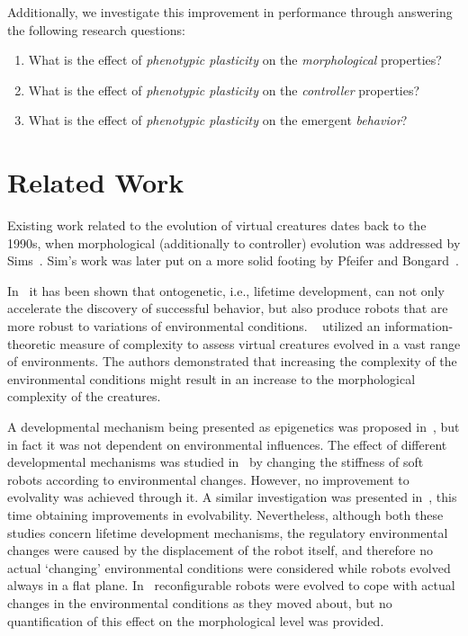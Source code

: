 \documentclass[utf8]{frontiersSCNS} %
\begin{document}
Additionally, we investigate this improvement in performance through answering the following research questions:
\begin{enumerate}

\item  What is the effect of \textit{phenotypic plasticity} on the \textit{morphological} properties?
\item  What is the effect of \textit{phenotypic plasticity} on the \textit{controller} properties?
\item  What is the effect of \textit{phenotypic plasticity} on the emergent \textit{behavior}?
\end{enumerate}


\section{Related Work}
Existing work related to the evolution of virtual creatures dates back to the 1990s, when morphological (additionally to controller) evolution was addressed by Sims~\citep{sims1994evolving}. Sim's work was later put on a more solid footing by Pfeifer and Bongard~\citep{pfeifer2005morphological}.

In~\citep{bongard2011morphological} it has been shown that ontogenetic, i.e., lifetime development, can not only accelerate the discovery of successful behavior, but also produce robots that are more robust to variations of environmental conditions.
~\citet{2014-AB} utilized an information-theoretic measure of complexity to assess virtual creatures evolved in a vast range of environments. The authors demonstrated that increasing the complexity of the environmental conditions might result in an increase to the morphological complexity of the creatures.

A developmental mechanism being presented as epigenetics was proposed in~\citep{brawer2017epigenetic}, but in fact it was not dependent on environmental influences. 
The effect of different developmental mechanisms was studied in~\citep{kriegman2018interoceptive} by changing the stiffness of soft robots according to environmental changes. However, no improvement to evolvality was achieved through it. A similar investigation was presented in~\citep{kriegman2018morphological}, this time obtaining improvements in evolvability. Nevertheless, although both these studies concern lifetime development mechanisms, the regulatory environmental changes were caused by the displacement of the robot itself, and therefore no actual `changing' environmental conditions were considered while robots evolved always in a flat plane. In~\citep{daudelin2018integrated}
reconfigurable robots were evolved to cope with actual changes in the environmental conditions as they moved about, but no quantification of this effect on the morphological level was provided. 
\end{document}
